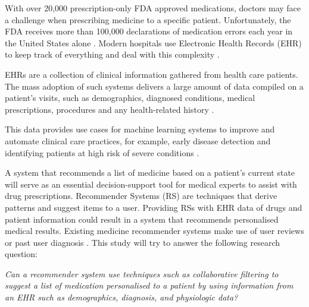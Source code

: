 With over 20,000 prescription-only FDA approved medications, doctors may face a
challenge when prescribing medicine to a specific patient. Unfortunately, the
FDA receives more than 100,000 declarations of medication errors each year in
the United States alone \cite{FDA2021}. Modern hospitals use Electronic Health
Records (EHR) to keep track of everything and deal with this complexity
\cite{Kim2019}. 

EHRs are a collection of clinical information gathered from health care
patients. The mass adoption of such systems delivers a large amount of data
compiled on a patient's visits, such as demographics, diagnosed conditions,
medical prescriptions, procedures and any health-related history
\cite{Kim2019}.

This data provides use cases for machine learning systems to improve and
automate clinical care practices, for example, early disease detection and
identifying patients at high risk of severe conditions \cite{10.2307/20720782,
Juhn2019}.

A system that recommends a list of medicine based on a
patient's current state will serve as an essential
decision-support tool for medical experts to assist with
drug prescriptions. Recommender Systems (RS) are
techniques that derive patterns and suggest items to a
user\cite{Ricci2011}. Providing RSs with EHR data of drugs and patient
information could result in a system that recommends
personalised medical results. Existing medicine recommender systems make use of user
reviews or past user diagnosis \cite{Bhoi2021, Rao2020}.
This study will try
to answer the following research question:
\begin{center} \textit{
Can a recommender system use techniques such as
collaborative filtering to suggest a list of
medication personalised to a patient by using
information from an EHR such as demographics,
diagnosis, and physiologic data?
}
\end{center}
